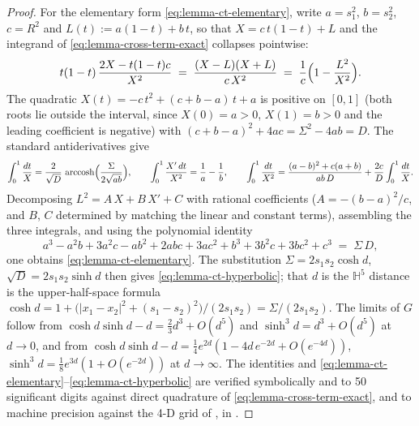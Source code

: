 \documentclass[11pt,letterpaper]{article}
\theoremstyle{definition}
\newcommand{\bbH}{\mathbb{H}}
\begin{document}
\begin{proof}
For the elementary form \eqref{eq:lemma-ct-elementary}, write $a = s_1^2$, $b = s_2^2$, $c = R^2$ and $L(t) := a(1-t) + b\,t$, so that $X = c\,t(1-t) + L$ and the integrand of \eqref{eq:lemma-cross-term-exact} collapses pointwise:
\[
t(1-t)\,\frac{2X - t(1-t)c}{X^2} \;=\; \frac{(X - L)(X + L)}{c\,X^2} \;=\; \frac1c\Bigl(1 - \frac{L^2}{X^2}\Bigr).
\]
The quadratic $X(t) = -c\,t^2 + (c + b - a)\,t + a$ is positive on $[0,1]$ (both roots lie outside the interval, since $X(0) = a > 0$, $X(1) = b > 0$ and the leading coefficient is negative) with $(c+b-a)^2 + 4ac = \Sigma^2 - 4ab = D$. The standard antiderivatives give
\[
\int_0^1 \frac{dt}{X} = \frac{2}{\sqrt D}\,\operatorname{arccosh}\Bigl(\frac{\Sigma}{2\sqrt{ab}}\Bigr),\qquad
\int_0^1 \frac{X'\,dt}{X^2} = \frac1a - \frac1b,\qquad
\int_0^1 \frac{dt}{X^2} = \frac{(a-b)^2 + c(a+b)}{ab\,D} + \frac{2c}{D}\int_0^1 \frac{dt}{X}.
\]
Decomposing $L^2 = A\,X + B\,X' + C$ with rational coefficients ($A = -(b-a)^2/c$, and $B$, $C$ determined by matching the linear and constant terms), assembling the three integrals, and using the polynomial identity
\[
a^3 - a^2 b + 3a^2 c - a b^2 + 2abc + 3ac^2 + b^3 + 3b^2c + 3bc^2 + c^3 \;=\; \Sigma\,D,
\]
one obtains \eqref{eq:lemma-ct-elementary}. The substitution $\Sigma = 2 s_1 s_2 \cosh d$, $\sqrt D = 2 s_1 s_2 \sinh d$ then gives \eqref{eq:lemma-ct-hyperbolic}; that $d$ is the $\bbH^5$ distance is the upper-half-space formula $\cosh d = 1 + \bigl(|x_1 - x_2|^2 + (s_1 - s_2)^2\bigr)/(2 s_1 s_2) = \Sigma/(2 s_1 s_2)$. The limits of $G$ follow from $\cosh d \sinh d - d = \tfrac23 d^3 + O(d^5)$ and $\sinh^3 d = d^3 + O(d^5)$ at $d \to 0$, and from $\cosh d\sinh d - d = \tfrac14 e^{2d}(1 - 4d\,e^{-2d} + O(e^{-4d}))$, $\sinh^3 d = \tfrac18 e^{3d}(1 + O(e^{-2d}))$ at $d \to \infty$. The identities and \eqref{eq:lemma-ct-elementary}--\eqref{eq:lemma-ct-hyperbolic} are verified symbolically and to 50 significant digits against direct quadrature of \eqref{eq:lemma-cross-term-exact}, and to machine precision against the 4-D grid of \cite{lemma-ct-rust}, in \cite{lemma-ct-elementary}.


\end{proof}
\end{document}
